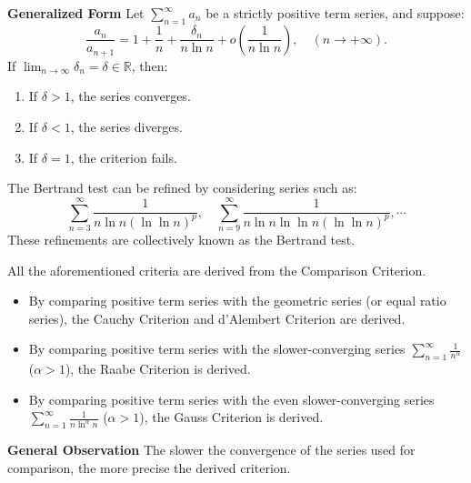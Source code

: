 \documentclass[11pt]{../../TexTemplate/elegantbook}
\begin{document}
\begin{theorem}
\begin{description}
        \textbf{Generalized Form}
        Let \( \sum_{n=1}^{\infty} a_n \) be a strictly positive term series, and suppose:
        \[
        \frac{a_n}{a_{n+1}} = 1 + \frac{1}{n} + \frac{\delta_n}{n \ln n} + o\left( \frac{1}{n \ln n} \right), 
        \quad (n \to +\infty).
        \]
        If \( \lim_{n \to \infty} \delta_n = \delta \in \mathbb{R} \), then:
        \begin{enumerate}
            \item If \( \delta > 1 \), the series converges.
            \item If \( \delta < 1 \), the series diverges.
            \item If \( \delta = 1 \), the criterion fails.
        \end{enumerate}
\end{description}
\end{theorem}

\begin{note}
    The Bertrand test can be refined by considering series such as:
    \[
    \sum_{n=3}^{\infty} \frac{1}{n \ln n (\ln \ln n)^p}, 
    \quad \sum_{n=9}^{\infty} \frac{1}{n \ln n \ln \ln n (\ln \ln n)^p}, 
    \cdots
    \]
    These refinements are collectively known as the Bertrand test.
\end{note}

\begin{remark}
    All the aforementioned criteria are derived from the Comparison Criterion.
    \begin{itemize}
        \item By comparing positive term series with the geometric series (or equal ratio series), 
            the Cauchy Criterion and d'Alembert Criterion are derived.
        \item By comparing positive term series with the slower-converging series 
            \( \sum_{n=1}^{\infty} \frac{1}{n^\alpha} \) (\( \alpha > 1 \)), the Raabe Criterion is derived.
        \item By comparing positive term series with the even slower-converging series 
            \( \sum_{n=1}^{\infty} \frac{1}{n \ln^\alpha n} \) (\( \alpha > 1 \)), the Gauss Criterion is derived.
    \end{itemize}
    \textbf{General Observation}
    The slower the convergence of the series used for comparison, the more precise the derived criterion.
\end{remark}
\end{document}
